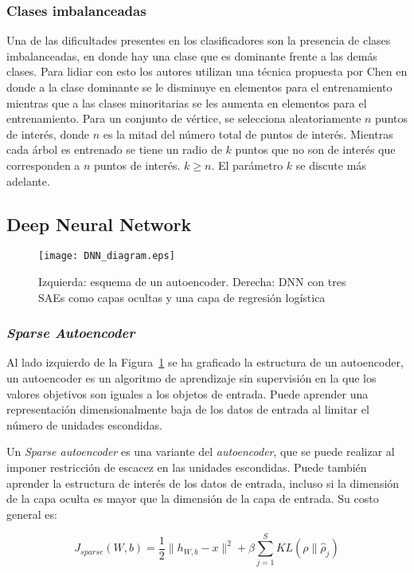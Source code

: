 \documentclass[conference]{IEEEtran}
\begin{document}
\subsubsection{Clases imbalanceadas}
Una de las dificultades presentes en los clasificadores son la presencia de clases imbalanceadas, en donde hay una clase que es dominante frente a las demás clases. Para lidiar con esto los autores utilizan una técnica propuesta por Chen en donde a la clase dominante se le disminuye en elementos para el entrenamiento mientras que a las clases minoritarias se les aumenta en elementos para el entrenamiento. Para un conjunto de vértice, se selecciona aleatoriamente $n$ puntos de interés, donde $n$ es la mitad del número total de puntos de interés. Mientras cada árbol es entrenado se tiene un radio de $k$ puntos que no son de interés que corresponden a $n$ puntos de interés. $k \geq n$. El parámetro $k$ se discute más adelante.

\subsection{Deep Neural Network}

\begin{figure}
\texttt{[image: DNN\_diagram.eps]}
\caption{Izquierda: esquema de un autoencoder. Derecha: DNN con tres SAEs como capas ocultas y una capa de regresión logística \cite{dnn}}
\label{fig:DNN_diagram}
\end{figure}

\subsubsection{\textit{Sparse Autoencoder}}
Al lado izquierdo de la Figura~\ref{fig:DNN_diagram} se ha graficado la estructura de un autoencoder, un autoencoder es un algoritmo de aprendizaje sin supervisión en la que los valores objetivos son iguales a los objetos de entrada. Puede aprender una representación dimensionalmente baja de los datos de entrada al limitar el número de unidades escondidas.

Un \textit{Sparse autoencoder} es una variante del \textit{autoencoder}, que se puede realizar al imponer restricción de escacez en las unidades escondidas. Puede también aprender la estructura de interés de los datos de entrada, incluso si la dimensión de la capa oculta es mayor que la dimensión de la capa de entrada. Su costo general es:

\begin{equation}
  J_{sparse}(W, b) = \frac{1}{2} \|h_{W, b}-x\|^{2} + \beta \sum_{j=1}^{S}{KL(\rho\|\hat{\rho}_{j})}
\end{equation}
\end{document}
